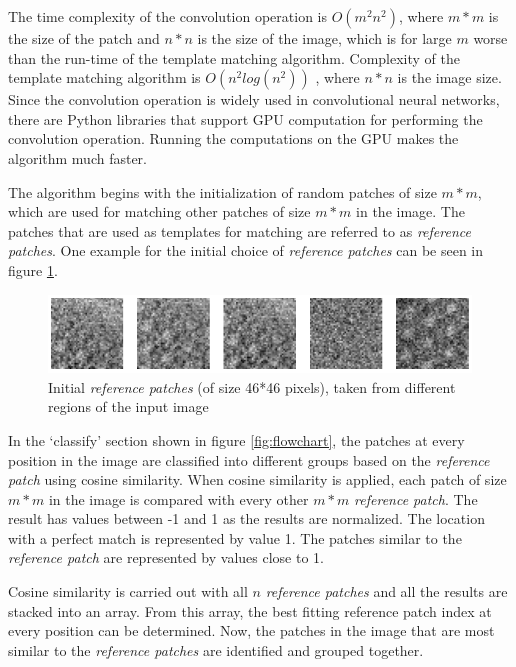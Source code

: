\documentclass[fleqn,10pt]{wlscirep}
\begin{document}
	
	The time complexity of the convolution operation is $O(m^2n^2)$, where $m*m$ is the size of the patch and $n*n$ is the size of the image, which is for large $m$ worse than the run-time of the template matching algorithm. Complexity of the template matching algorithm is $O(n^2log(n^2))$ \cite{template_matching}, where $n*n$ is the image size. Since the convolution operation is widely used in convolutional neural networks, there are Python libraries that support GPU computation for performing the convolution operation. Running the computations on the GPU makes the algorithm much faster.
	
	The algorithm begins with the initialization of random patches of size $m*m$, which are used for matching other patches of size $m*m$ in the image. The patches that are used as templates for matching are referred to as \textit{reference patches}. One example for the initial choice of \textit{reference patches} can be seen in figure \ref{fig:initial_reference_patches}. 
	
	\begin{figure}
		\centering
		\includegraphics[scale=0.75]{./imgs/initial_reference_patches.png}
		\caption[Initial \textit{reference patches}]{Initial \textit{reference patches} (of size 46*46 pixels), taken from different regions of the input image}
		\label{fig:initial_reference_patches}
	\end{figure} 
	
	In the `classify'  section shown in figure \ref{fig:flowchart}, the patches at every position in the image are classified into different groups based on the \textit{reference patch} using cosine similarity. When cosine similarity is applied, each patch of size $m*m$ in the image is compared with every other $m*m$ \textit{reference patch}. The result has values between -1 and 1 as the results are normalized. The location with a perfect match is represented by value 1. The patches similar to the \textit{reference patch} are represented by values close to 1. 
	
	Cosine similarity is carried out with all $n$ \textit{reference patches} and all the results are stacked into an array. From this array, the best fitting reference patch index at every position can be determined. Now, the patches in the image that are most similar to the \textit{reference patches} are identified and grouped together.   
	
\end{document}
